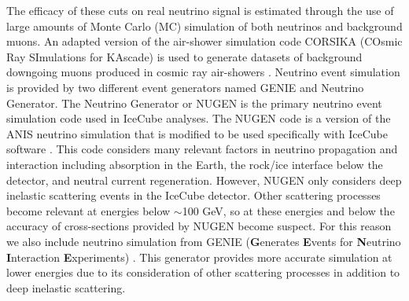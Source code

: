 \documentclass{gatech-thesis}
\begin{document}
The efficacy of these cuts on real neutrino signal is estimated through the use of large amounts of Monte Carlo (MC) simulation of both neutrinos and background muons. An adapted version of the air-shower simulation code CORSIKA (COsmic Ray SImulations for KAscade) is used to generate datasets of background downgoing  muons produced in cosmic ray air-showers \cite{1998cmcc.book.....H}.  Neutrino event simulation is provided by two different event generators named GENIE and Neutrino Generator. The Neutrino Generator or NUGEN is the primary neutrino event simulation code used in IceCube analyses. The NUGEN code is a version of the ANIS neutrino simulation that is modified to be used specifically with IceCube software \cite{2005CoPhC.172..203G}. This code considers many relevant factors in neutrino propagation and interaction including absorption in the Earth, the rock/ice interface below the detector, and neutral current regeneration. However, NUGEN only considers deep inelastic scattering events in the IceCube detector. Other scattering processes become relevant at energies below $\sim$100 GeV, so at these energies and below the accuracy of cross-sections provided by NUGEN become suspect. For this reason we also include neutrino simulation from GENIE (\textbf{G}enerates \textbf{E}vents for \textbf{N}eutrino \textbf{I}nteraction \textbf{E}xperiments) \cite{2010NIMPA.614...87A}. This generator provides more accurate simulation at lower energies due to its consideration of other scattering processes in addition to deep inelastic scattering.
\end{document}
